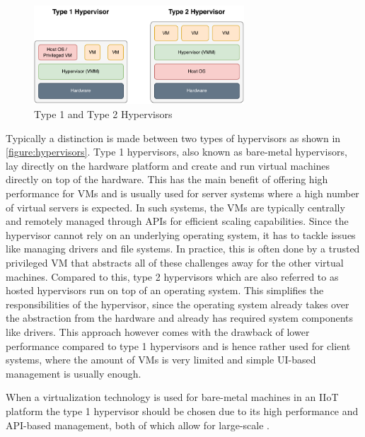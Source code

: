     \begin{figure}[htbp]
        \centering
        \includegraphics[width=0.7\textwidth]{img/hypervisors.pdf}
        \caption{Type 1 and Type 2 Hypervisors}
        \label{figure:hypervisors}
    \end{figure}

    \noindent Typically a distinction is made between two types of hypervisors as shown in \autoref{figure:hypervisors}. Type 1 hypervisors, also known as bare-metal hypervisors, lay directly on the hardware platform and create and run virtual machines directly on top of the hardware. This has the main benefit of offering high performance for VMs and is usually used for server systems where a high number of virtual servers is expected. In such systems, the VMs are typically centrally and remotely managed through APIs for efficient scaling capabilities. Since the hypervisor cannot rely on an underlying operating system, it has to tackle issues like managing drivers and file systems. In practice, this is often done by a trusted privileged VM that abstracts all of these challenges away for the other virtual machines. Compared to this, type 2 hypervisors which are also referred to as hosted hypervisors run on top of an operating system. This simplifies the responsibilities of the hypervisor, since the operating system already takes over the abstraction from the hardware and already has required system components like drivers. This approach however comes with the drawback of lower performance compared to type 1 hypervisors and is hence rather used for client systems, where the amount of VMs is very limited and simple UI-based management is usually enough. 
    
    When a virtualization technology is used for bare-metal machines in an IIoT platform the type 1 hypervisor should be chosen due to its high performance and API-based management, both of which allow for large-scale \cite{vs_anforderungsprofil}. \newline

